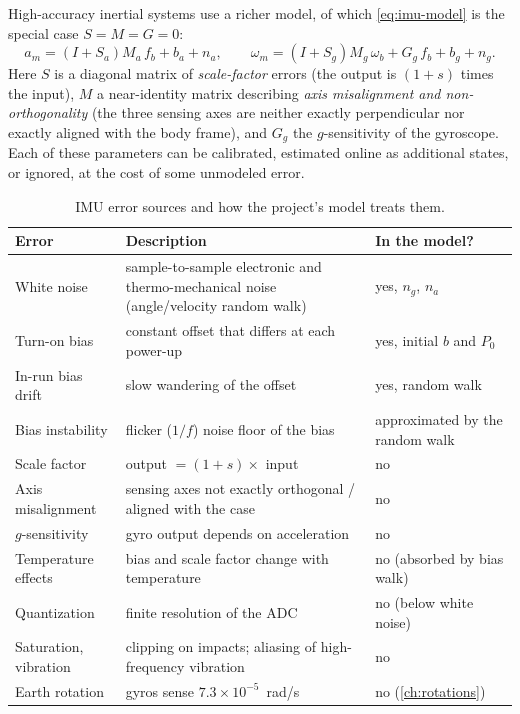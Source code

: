 High-accuracy inertial systems use a richer model, of which \eqref{eq:imu-model} is the special case $S = M = G = 0$:
\begin{equation}
  a_m = (I + S_a)M_a\,f_b + b_a + n_a, \qquad \omega_m = (I + S_g)M_g\,\omega_b + G_g\,f_b + b_g + n_g .
\end{equation}
Here $S$ is a diagonal matrix of \emph{scale-factor} errors (the output is $(1 + s)$ times the input), $M$ a near-identity matrix describing \emph{axis
misalignment and non-orthogonality} (the three sensing axes are neither exactly perpendicular nor exactly aligned with the body frame), and $G_g$ the
$g$-sensitivity of the gyroscope. Each of these parameters can be calibrated, estimated online as additional states, or ignored, at the cost of
some unmodeled error.

\begin{table}[t]
\centering\small
\begin{tabularx}{\textwidth}{@{}l X l@{}}
\toprule
\textbf{Error} & \textbf{Description} & \textbf{In the model?} \\
\midrule
White noise & sample-to-sample electronic and thermo-mechanical noise (angle/velocity random walk) & yes, $n_g$, $n_a$ \\
Turn-on bias & constant offset that differs at each power-up & yes, initial $b$ and $P_0$ \\
In-run bias drift & slow wandering of the offset & yes, random walk \\
Bias instability & flicker ($1/f$) noise floor of the bias & approximated by the random walk \\
Scale factor & output $= (1 + s)\times$ input & no \\
Axis misalignment & sensing axes not exactly orthogonal / aligned with the case & no \\
$g$-sensitivity & gyro output depends on acceleration & no \\
Temperature effects & bias and scale factor change with temperature & no (absorbed by bias walk) \\
Quantization & finite resolution of the ADC & no (below white noise) \\
Saturation, vibration & clipping on impacts; aliasing of high-frequency vibration & no \\
Earth rotation & gyros sense $7.3\times10^{-5}$~rad/s & no (\cref{ch:rotations}) \\
\bottomrule
\end{tabularx}
\caption{IMU error sources and how the project's model treats them.}
\label{tab:imu-errors}
\end{table}

